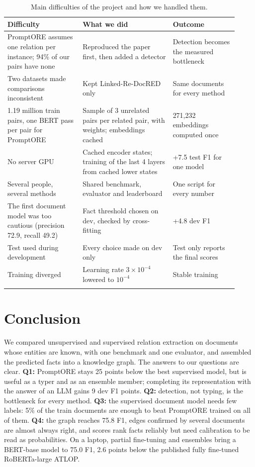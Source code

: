 \documentclass[pdflatex,sn-mathphys-num]{sn-jnl}
\begin{document}
\begin{table}[htbp]
\caption{Main difficulties of the project and how we handled them.}\label{tab:difficulties}
\centering
\small
\begin{tabular}{@{}p{0.3\linewidth}p{0.36\linewidth}p{0.26\linewidth}@{}}
\toprule
Difficulty & What we did & Outcome \\
\midrule
PromptORE assumes one relation per instance; 94\% of our pairs have none & Reproduced the paper first, then added a detector & Detection becomes the measured bottleneck \\
Two datasets made comparisons inconsistent & Kept Linked-Re-DocRED only & Same documents for every method \\
1.19 million train pairs, one BERT pass per pair for PromptORE & Sample of 3 unrelated pairs per related pair, with weights; embeddings cached & 271,232 embeddings computed once \\
No server GPU & Cached encoder states; training of the last 4 layers from cached lower states & +7.5 test F1 for one model \\
Several people, several methods & Shared benchmark, evaluator and leaderboard & One script for every number \\
The first document model was too cautious (precision 72.9, recall 49.2) & Fact threshold chosen on dev, checked by cross-fitting & +4.8 dev F1 \\
Test used during development & Every choice made on dev only & Test only reports the final scores \\
Training diverged & Learning rate $3\times10^{-4}$ lowered to $10^{-4}$ & Stable training \\
\botrule
\end{tabular}
\end{table}

\section{Conclusion}\label{sec:conclusion}

We compared unsupervised and supervised relation extraction on documents whose entities are known, with one benchmark and one evaluator, and assembled the predicted facts into a knowledge graph. The answers to our questions are clear. \textbf{Q1:} PromptORE stays 25 points below the best supervised model, but is useful as a typer and as an ensemble member; completing its representation with the answer of an LLM gains 9 dev F1 points. \textbf{Q2:} detection, not typing, is the bottleneck for every method. \textbf{Q3:} the supervised document model needs few labels: 5\% of the train documents are enough to beat PromptORE trained on all of them. \textbf{Q4:} the graph reaches 75.8 F1, edges confirmed by several documents are almost always right, and scores rank facts reliably but need calibration to be read as probabilities. On a laptop, partial fine-tuning and ensembles bring a BERT-base model to 75.0 F1, 2.6 points below the published fully fine-tuned RoBERTa-large ATLOP.
\end{document}
